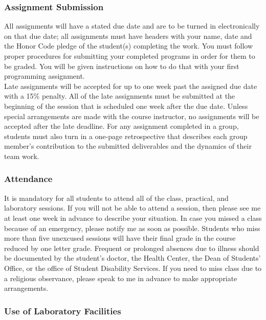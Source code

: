 \subsubsection*{Assignment Submission}

All assignments will have a stated due date and are to be turned in electronically on that due date; all assignments must have headers with your name, date and the Honor Code pledge of the
student(s) completing the work.  You must follow proper procedures for submitting your completed programs in order for them to be graded. You will be given instructions on how to do that with your first programming assignment. \\

\noindent Late assignments will be accepted for up to one week past the assigned due date with a
15\% penalty. All of the late assignments must be submitted at the beginning of the session that is scheduled one week
after the due date. Unless special arrangements are made with the course instructor, no assignments will be accepted
after the late deadline. For any assignment completed in a group, students must also turn in a one-page retrospective that
describes each group member's contribution to the submitted deliverables and the dynamics of their team work. 

\subsubsection*{Attendance}

It is mandatory for all students to attend all of the class, practical, and laboratory sessions. If you will not be able
to attend a session, then please see me at least one week in advance to describe your situation. In case you missed a class because of an emergency, please notify me as soon as possible. 
Students who miss more than five unexcused sessions will have their final grade in the course reduced by one letter grade. 
 Frequent or prolonged absences due to illness should be documented by the student's doctor, the Health Center, the Dean of Students' Office, or the office of Student Disability Services. If you need to miss class due to a religious observance, please speak to me in advance to make appropriate arrangements. 

\subsubsection*{Use of Laboratory Facilities}

